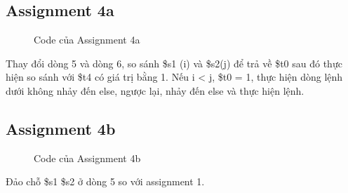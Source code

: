 \documentclass[a4paper,12pt]{article}
\begin{document}
\subsection{Assignment 4a}
\begin{figure}[!h]
	\centerline{}
	\caption{Code của Assignment 4a}
	\label{fig:ass4}
\end{figure}
\noindent
Thay đổi dòng 5 và dòng 6, so sánh \$s1 (i) và \$s2(j) để trả về \$t0 sau đó thực hiện so sánh với \$t4 có giá trị bằng 1. Nếu i < j, \$t0 = 1, thực hiện dòng lệnh dưới không nhảy đến else, ngược lại, nhảy đến else và thực hiện lệnh. \\
\clearpage
\newpage
\subsection{Assignment 4b}
\begin{figure}[!h]
	\centerline{}
	\caption{Code của Assignment 4b}
	\label{fig:ass4b}
\end{figure}
\noindent
Đảo chỗ \$s1 \$s2 ở dòng 5 so với assignment 1. \\ 
\clearpage
\newpage
\end{document}

